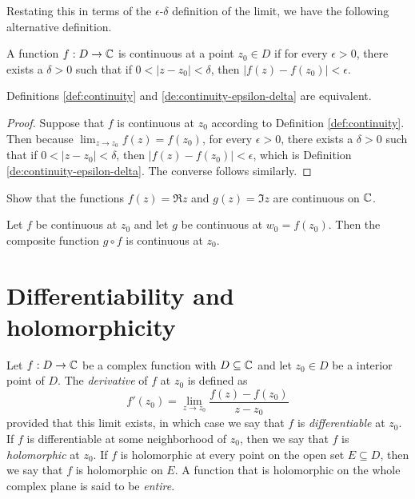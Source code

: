 Restating this in terms of the \(\epsilon\)-\(\delta\) definition of the limit, we have the following alternative definition.

\begin{definition}%
    A function \(f : D \to \mathbb{C}\) is continuous at a point \(z_0 \in D\) if for every \(\epsilon > 0\), there exists a \(\delta > 0\) such that if \(0 < |z - z_0| < \delta\), then \(|f(z) - f(z_0)| < \epsilon\).
    \label{de:continuity-epsilon-delta}
\end{definition}

\begin{theorem}%
    Definitions {\normalfont\ref{def:continuity}} and {\normalfont\ref{de:continuity-epsilon-delta}} are equivalent.
\end{theorem}

\begin{proof}
    Suppose that \(f\) is continuous at \(z_0\) according to Definition \ref{def:continuity}. Then because \(\lim_{z \to z_0} f(z) = f(z_0)\), for every \(\epsilon > 0\), there exists a \(\delta > 0\) such that if \(0 < |z - z_0| < \delta\), then \(|f(z) - f(z_0)| < \epsilon\), which is Definition \ref{de:continuity-epsilon-delta}. The converse follows similarly.
\end{proof}

\begin{example}
    Show that the functions \(f(z) = \Re z\) and \(g(z) = \Im z\) are continuous on \(\mathbb{C}\).
\end{example}

\begin{theorem}%
    \label{thm:continuity-composite}
    Let \(f\) be continuous at \(z_0\) and let \(g\) be continuous at \(w_0 = f(z_0)\). Then the composite function \(g \circ f\) is continuous at \(z_0\). 
\end{theorem}


\section{Differentiability and holomorphicity}

\begin{definition} \label{def:complex-derivative}
    Let \(f : D \to \mathbb{C}\) be a complex function with \(D \subseteq \mathbb{C}\) and let \(z_0 \in D\) be a interior point of \(D\). The \emph{derivative} of \(f\) at \(z_0\) is defined as
    \begin{equation}
        f'(z_0) = \lim_{z \to z_0} \frac{f(z) - f(z_0)}{z - z_0}\label{eq:complex-derivative}
    \end{equation}
    provided that this limit exists, in which case we say that \(f\) is \emph{differentiable} at \(z_0\). If \(f\) is differentiable at some neighborhood of \(z_0\), then we say that \(f\) is \emph{holomorphic} at \(z_0\). If \(f\) is holomorphic at every point on the open set \(E \subseteq D\), then we say that \(f\) is holomorphic on \(E\). A function that is holomorphic on the whole complex plane is said to be \emph{entire}.
\end{definition}

